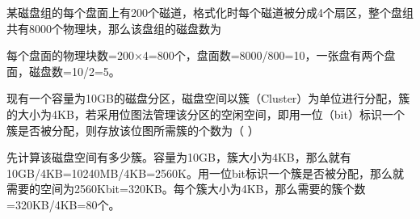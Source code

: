 \question 某磁盘组的每个盘面上有200个磁道，格式化时每个磁道被分成4个扇区，整个盘组共有8000个物理块，那么该盘组的磁盘数为
\par{}
\begin{solution}每个盘面的物理块数=200×4=800个，盘面数=8000/800=10，一张盘有两个盘面，磁盘数=10/2=5。
\end{solution}
\question 现有一个容量为10GB的磁盘分区，磁盘空间以簇（Cluster）为单位进行分配，簇的大小为4KB，若采用位图法管理该分区的空闲空间，即用一位（bit）标识一个簇是否被分配，则存放该位图所需簇的个数为（
）
\par{}
\begin{solution}先计算该磁盘空间有多少簇。容量为10GB，簇大小为4KB，那么就有10GB/4KB=10240MB/4KB=2560K。用一位bit标识一个簇是否被分配，那么就需要的空间为2560Kbit=320KB。每个簇大小为4KB，那么需要的簇个数=320KB/4KB=80个。
\end{solution}
